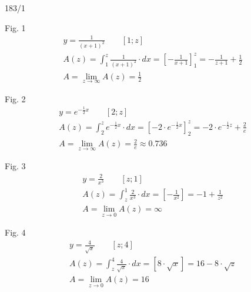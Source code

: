 \begin{exercise}{183/1}
  \item [Fig. 1]
  \begin{gather*}
    y = \frac{1}{(x + 1)^2} \qquad \left[1; z\right] \\
    A(z) = \int_1^z \frac{1}{(x + 1)^2} \cdot dx = \left[-\frac{1}{x + 1}\right]_1^z = -\frac{1}{z + 1} + \frac{1}{2} \\
    A = \lim\limits_{z \to \infty} A(z) = \frac{1}{2}
  \end{gather*}
  \item [Fig. 2]
  \begin{gather*}
    y = e^{-\frac{1}{2}x} \qquad \left[2; z\right] \\
    A(z) = \int_2^z e^{-\frac{1}{2}x} \cdot dx = \left[-2 \cdot e^{-\frac{1}{2}x}\right]_2^z = -2 \cdot e^{-\frac{1}{2}z} + \frac{2}{e} \\
    A = \lim\limits_{z \to \infty} A(z) = \frac{2}{e} \approx 0.736
  \end{gather*}
  \item [Fig. 3]
  \begin{gather*}
    y = \frac{2}{x^3} \qquad \left[z; 1\right] \\
    A(z) = \int_z^1 \frac{2}{x^3} \cdot dx = \left[-\frac{1}{x^2}\right] = -1 + \frac{1}{z^2} \\
    A = \lim\limits_{z \to 0} A(z) = \infty
  \end{gather*}
  \item [Fig. 4]
  \begin{gather*}
    y = \frac{4}{\sqrt{x}} \qquad \left[z; 4\right] \\
    A(z) = \int_z^4 \frac{4}{\sqrt{x}} \cdot dx = \left[8 \cdot \sqrt{x}\right] = 16 - 8 \cdot \sqrt{z} \\
    A = \lim\limits_{z \to 0} A(z) = 16
  \end{gather*}
\end{exercise}
